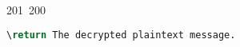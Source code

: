 201~200~\documentclass{article}
\begin{document}
\begin{lstlisting}[language=Python, caption=Decrypting a Message with ChaCha20-Poly1305]
	                                                                                                                                                                                                                                                                                                	                                                                                                                                        	    	                                                                                                	                                                                                                                                                                                                                                                                                                                                	                                                                        	                                                                        	                                                                                                                                        	                                                                                                                                                                                                                        	                                                                                                                            	                                                                	                                                                                                                                                                    \return The decrypted plaintext message.

\end{lstlisting}
\end{document}
